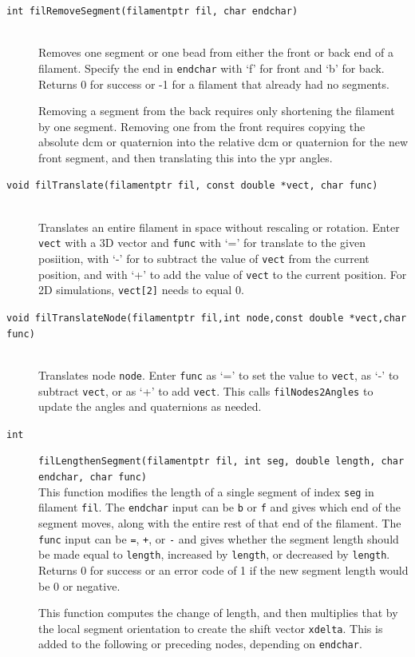 \documentclass {scrbook}
\newcommand {\ttt} {\texttt}
\begin{document}
\begin{description}
\item[\ttt{int filRemoveSegment(filamentptr fil, char endchar)}]
\hfill \\
Removes one segment or one bead from either the front or back end of a filament. Specify the end in \ttt{endchar} with `f' for front and `b' for back. Returns 0 for success or -1 for a filament that already had no segments.

Removing a segment from the back requires only shortening the filament by one segment. Removing one from the front requires copying the absolute dcm or quaternion into the relative dcm or quaternion for the new front segment, and then translating this into the ypr angles.

\item[\ttt{void filTranslate(filamentptr fil, const double *vect, char func)}]
\hfill \\
Translates an entire filament in space without rescaling or rotation. Enter \ttt{vect} with a 3D vector and \ttt{func} with `=' for translate to the given posiition, with `-' for to subtract the value of \ttt{vect} from the current position, and with `+' to add the value of \ttt{vect} to the current position. For 2D simulations, \ttt{vect[2]} needs to equal 0.

\item[\ttt{void filTranslateNode(filamentptr fil,int node,const double *vect,char func)}]
\hfill \\
Translates node \ttt{node}. Enter \ttt{func} as `=' to set the value to \ttt{vect}, as `-' to subtract \ttt{vect}, or as `+' to add \ttt{vect}. This calls \ttt{filNodes2Angles} to update the angles and quaternions as needed.

\item[\ttt{int}]
\ttt{filLengthenSegment(filamentptr fil, int seg, double length, char endchar, char func)}
\hfill \\
This function modifies the length of a single segment of index \ttt{seg} in filament \ttt{fil}. The \ttt{endchar} input can be \ttt{b} or \ttt{f} and gives which end of the segment moves, along with the entire rest of that end of the filament. The \ttt{func} input can be \ttt{=}, \ttt{+}, or \ttt{-} and gives whether the segment length should be made equal to \ttt{length}, increased by \ttt{length}, or decreased by \ttt{length}. Returns 0 for success or an error code of 1 if the new segment length would be 0 or negative.

This function computes the change of length, and then multiplies that by the local segment orientation to create the shift vector \ttt{xdelta}. This is added to the following or preceding nodes, depending on \ttt{endchar}.


\end{description}
\end{document}
